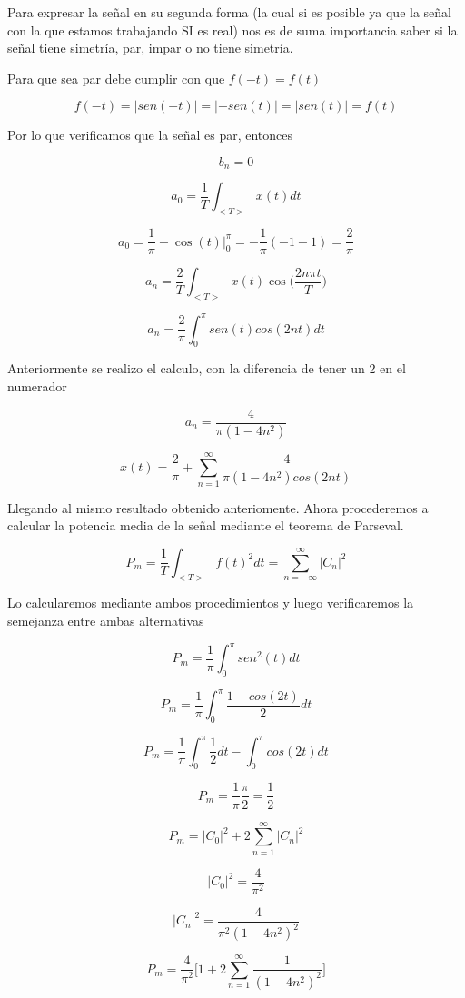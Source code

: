 Para expresar la se\~nal en su segunda forma (la cual si es posible ya que la se\~nal con la que estamos trabajando SI es real) nos es de suma importancia saber si la se\~nal tiene simetr\'ia, par, impar o no tiene simetr\'ia.

Para que sea par debe cumplir con que $f(-t) = f(t)$

$$f(-t) = |sen(-t)| = |-sen(t)| = |sen(t)| = f(t) $$

Por lo que verificamos que la se\~nal es par, entonces

$$b_n = 0 $$

$$a_0 = \dfrac{1}{T} \int_{<T>} x(t) dt $$

$$a_0 = \dfrac{1}{\pi} -\cos (t) \bigg\rvert_{0}^{\pi} = -\dfrac{1}{\pi} (-1-1) = \dfrac{2}{\pi} $$

$$a_n = \dfrac{2}{T} \int_{<T>} x(t) \cos \bigg(\dfrac{2n\pi t}{T} \bigg) $$

$$a_n = \dfrac{2}{\pi} \int_{0}^{\pi} sen(t) cos(2nt) dt $$

Anteriormente se realizo el calculo, con la diferencia de tener un 2 en el numerador

$$a_n = \dfrac{4}{\pi(1-4n^2)} $$

\[x(t) = \dfrac{2}{\pi} + \sum_{n=1}^{\infty} \dfrac{4}{\pi(1-4n^2) cos(2nt)} \]

Llegando al mismo resultado obtenido anteriomente. Ahora procederemos a calcular la potencia media de la se\~nal mediante el teorema de Parseval.

\[P_m = \dfrac{1}{T} \int_{<T>} f(t)^2 dt = \sum_{n=-\infty}^{\infty} |C_n|^2 \]

Lo calcularemos mediante ambos procedimientos y luego verificaremos la semejanza entre ambas alternativas

$$P_m = \dfrac{1}{\pi} \int_{0}^{\pi} sen^2 (t) dt $$

$$P_m = \dfrac{1}{\pi} \int_{0}^{\pi} \dfrac{1-cos(2t)}{2} dt$$

$$P_m = \dfrac{1}{\pi} \int_{0}^{\pi} \dfrac{1}{2} dt - \int_{0}^{\pi} cos(2t) dt $$

$$P_m = \dfrac{1}{\pi} \dfrac{\pi}{2} = \dfrac{1}{2} $$

\[P_m = |C_0|^2 + 2 \sum_{n=1}^{\infty} |C_n|^2 \]

$$|C_0|^2 = \dfrac{4}{\pi^2} $$

$$|C_n|^2 = \dfrac{4}{\pi^2(1-4n^2)^2} $$

\[P_m = \dfrac{4}{\pi^2} \bigg[1 + 2\sum_{n=1}^{\infty} \dfrac{1}{(1-4n^2)^2} \bigg] \]

